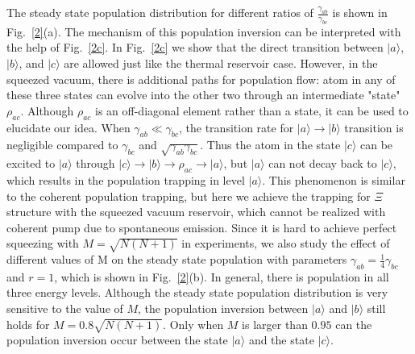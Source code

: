 \documentclass[aps,showpacs,twocolumn,twoside,groupedaddress]{revtex4}
\begin{document}
The steady state population distribution for different ratios of $\frac{\gamma_{ab}}{\gamma_{bc}}$ is shown in Fig.~\ref{2}(a). The mechanism of this population inversion can be interpreted with the help of Fig.~\ref{2c}. In Fig.~\ref{2c} we show that the direct transition between $|a\rangle$, $|b\rangle$, and $|c\rangle$ are allowed just like the thermal reservoir case. However, in the squeezed vacuum, there is additional paths for population flow: atom in any of these three states can evolve into the other two through an intermediate "state" $\rho_{ac}$. Although $\rho_{ac}$ is an off-diagonal element rather than a state, it can be used to elucidate our idea. When $\gamma_{ab}\ll\gamma_{bc}$, the transition rate for $|a\rangle\rightarrow|b\rangle$ transition is negligible compared to $\gamma_{bc}$ and $\sqrt{\gamma_{ab}\gamma_{bc}}$. Thus the atom in the state $|c\rangle$ can be excited to $|a\rangle$ through $|c\rangle\rightarrow|b\rangle\rightarrow\rho_{ac}\rightarrow|a\rangle$, but $|a\rangle$ can not decay back to $|c\rangle$, which results in the population trapping in level $|a\rangle$. This phenomenon is similar to the coherent population trapping, but here we achieve the trapping for $\Xi$ structure with the squeezed vacuum reservoir, which cannot be realized with coherent pump due to spontaneous emission. Since it is hard to achieve perfect squeezing with $M=\sqrt{N(N+1)}$ in experiments, we also study the effect of different values of M on the steady state population with parameters $\gamma_{ab}=\frac{1}{4}\gamma_{bc}$ and $r=1$, which is shown in Fig.~\ref{2}(b). In general, there is population in all three energy levels. Although the steady state population distribution is very sensitive to the value of $M$, the population inversion between $|a\rangle$ and $|b\rangle$ still holds for $M=0.8\sqrt{N(N+1)}$. Only when $M$ is larger than $0.95$ can the population inversion occur between the state $|a\rangle$ and the state $|c\rangle$.
\end{document}
